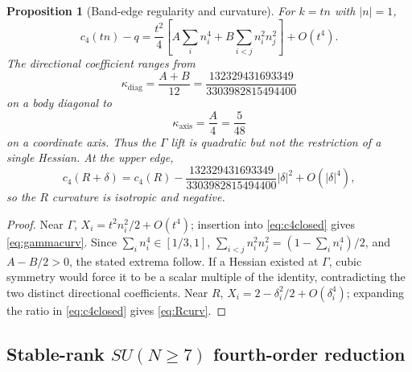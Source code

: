 \documentclass[11pt]{article}
\newtheorem{proposition}[theorem]{Proposition}
\begin{document}
\begin{proposition}[Band-edge regularity and curvature]\label{prop:y4curvature}
For $k=tn$ with $|n|=1$,
\begin{equation}
c_4(tn)-q
=\frac{t^2}{4}
\left[A\sum_i n_i^4+B\sum_{i<j}n_i^2n_j^2\right]+O(t^4).
\label{eq:gammacurv}
\end{equation}
The directional coefficient ranges from
\[
\kappa_{\mathrm{diag}}=\frac{A+B}{12}
=\frac{132329431693349}{3303982815494400}
\]
on a body diagonal to
\[
\kappa_{\mathrm{axis}}=\frac{A}{4}=\frac5{48}
\]
on a coordinate axis. Thus the $\Gamma$ lift is quadratic but not the
restriction of a single Hessian. At the upper edge,
\begin{equation}
c_4(R+\delta)=c_4(R)
-\frac{132329431693349}{3303982815494400}|\delta|^2
+O(|\delta|^4),
\label{eq:Rcurv}
\end{equation}
so the $R$ curvature is isotropic and negative.
\end{proposition}

\begin{proof}
Near $\Gamma$, $X_i=t^2n_i^2/2+O(t^4)$; insertion into
\eqref{eq:c4closed} gives \eqref{eq:gammacurv}. Since
$\sum_i n_i^4\in[1/3,1]$,
$\sum_{i<j}n_i^2n_j^2=(1-\sum_i n_i^4)/2$, and $A-B/2>0$, the stated
extrema follow.
If a Hessian existed at $\Gamma$, cubic symmetry would force it to be a
scalar multiple of the identity, contradicting the two distinct directional
coefficients. Near $R$, $X_i=2-\delta_i^2/2+O(\delta_i^4)$; expanding the
ratio in \eqref{eq:c4closed} gives \eqref{eq:Rcurv}.
\end{proof}


\subsection{Stable-rank $SU(N\geq7)$ fourth-order reduction}
\label{subsec:sunstable}
\end{document}
